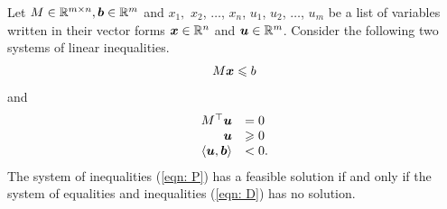 \begin{theorem}\label{farkas}
Let $M\in\mathbb R^{m\times n}, {\boldsymbol b}\in\mathbb R^m$ and $x_1,$ $x_2$, $\dots$, $x_n$, $u_1$, $u_2$, $\dots$, $u_m$ be a list of variables written in their vector forms ${\boldsymbol x}\in\mathbb R^n$ and ${\boldsymbol u}\in\mathbb R^m$. Consider the following two systems of linear inequalities. 
\begin{equation}\label{eqn: P}
M{\boldsymbol x}\leqslant b
\end{equation} and 
\begin{equation}\label{eqn: D}
\begin{array}{rl}
M^\top {\boldsymbol u} & = 0\\
{\boldsymbol u} & \geqslant 0\\
\left\langle{\boldsymbol u}, {\boldsymbol b}\right\rangle & < 0. \\
\end{array}
\end{equation}
The system of inequalities (\ref{eqn: P}) has a feasible solution if and only if the system of equalities and inequalities (\ref{eqn: D}) has no solution. 
\end{theorem}
